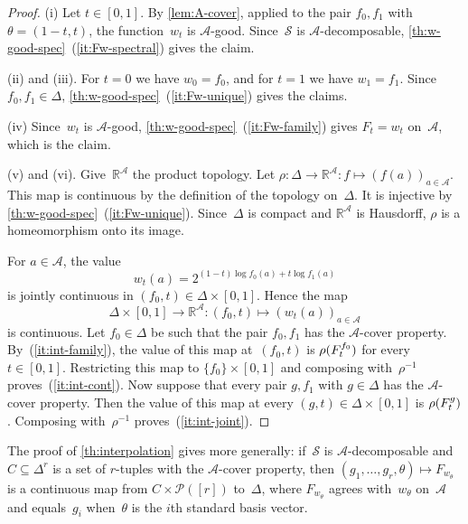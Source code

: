 \documentclass[11pt,letterpaper]{article}
\newcommand{\RR}{\mathbb{R}}
\begin{document}
\begin{proof}
(i) Let $t \in [0,1]$. By \cref{lem:A-cover}, applied to the pair $f_0, f_1$ with $\theta = (1-t,t)$, the function~$w_t$ is $\mathcal{A}$-good. Since~$\mathcal{S}$ is $\mathcal{A}$-decomposable, \cref{th:w-good-spec}~(\ref{it:Fw-spectral}) gives the claim.

(ii) and (iii). For $t = 0$ we have $w_0 = f_0$, and for $t = 1$ we have $w_1 = f_1$. Since $f_0, f_1 \in \Delta$, \cref{th:w-good-spec}~(\ref{it:Fw-unique}) gives the claims.

(iv) Since~$w_t$ is $\mathcal{A}$-good, \cref{th:w-good-spec}~(\ref{it:Fw-family}) gives $F_t = w_t$ on~$\mathcal{A}$, which is the claim.

(v) and (vi). Give~$\RR^{\mathcal{A}}$ the product topology. Let $\rho : \Delta \to \RR^{\mathcal{A}} : f \mapsto (f(a))_{a \in \mathcal{A}}$. This map is continuous by the definition of the topology on~$\Delta$. It is injective by \cref{th:w-good-spec}~(\ref{it:Fw-unique}). Since~$\Delta$ is compact and $\RR^{\mathcal{A}}$ is Hausdorff, $\rho$ is a homeomorphism onto its image.

For $a \in \mathcal{A}$, the value
\[
w_t(a)
=
2^{(1-t)\log f_0(a)+t\log f_1(a)}
\]
is jointly continuous in $(f_0,t)\in\Delta\times[0,1]$. Hence the map
\[
\Delta\times[0,1]\to\RR^{\mathcal{A}}:(f_0,t)\mapsto(w_t(a))_{a\in\mathcal{A}}
\]
is continuous. Let $f_0 \in \Delta$ be such that the pair $f_0, f_1$ has the $\mathcal{A}$-cover property. By~(\ref{it:int-family}), the value of this map at~$(f_0,t)$ is $\rho(F^{\smash[t]{f_0}}_t)$ for every $t \in [0,1]$. Restricting this map to $\{f_0\} \times [0,1]$ and composing with~$\rho^{-1}$ proves~(\ref{it:int-cont}). Now suppose that every pair $g, f_1$ with $g \in \Delta$ has the $\mathcal{A}$-cover property. Then the value of this map at every $(g,t) \in \Delta \times [0,1]$ is $\rho(F^{\smash[t]{g}}_t)$. Composing with~$\rho^{-1}$ proves~(\ref{it:int-joint}).
\end{proof}

The proof of \cref{th:interpolation} gives more generally: if~$\mathcal{S}$ is $\mathcal{A}$-decomposable and $C \subseteq \Delta^r$ is a set of $r$-tuples with the $\mathcal{A}$-cover property, then $(g_1, \ldots, g_r, \theta) \mapsto F_{w_\theta}$ is a continuous map from $C \times \mathcal{P}([r])$ to~$\Delta$, where $F_{w_\theta}$ agrees with~$w_\theta$ on~$\mathcal{A}$ and equals~$g_i$ when~$\theta$ is the $i$th standard basis vector.
\end{document}
